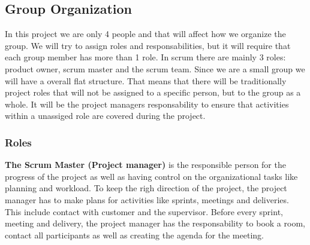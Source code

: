 \subsection{Group Organization}

In this project we are only 4 people and that will affect how we organize 
the group. We will try to assign roles and responsabilities, but it will
require that each group member has more than 1 role.
In scrum there are mainly 3 roles: product owner, scrum master and the
scrum team. Since we are a small group we will have a overall flat structure. That means that
there will be traditionally project roles that will not be assigned to a specific person, 
but to the group as a whole. It will be the project managers responsability to ensure 
that activities within a unassiged role are covered during the project.

\subsubsection{Roles}

{\bf The Scrum Master (Project manager)} is the responsible person for the progress of the project 
as well as having control on the organizational tasks like planning and workload.
To keep the righ direction of the project, the project manager has to make plans for 
activities like sprints, meetings and deliveries. This include contact with customer and the supervisor.
Before every sprint, meeting and delivery, the project manager has the responsability to book a room, contact all
participants as well as creating the agenda for the meeting. \\

